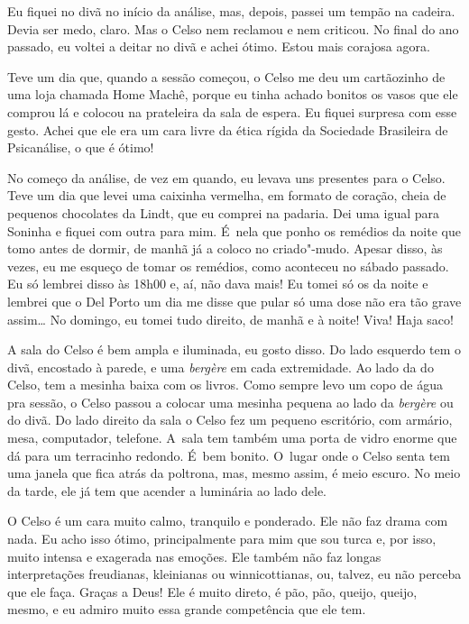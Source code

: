 Eu fiquei no divã no início da análise, mas, depois, passei um
tempão na cadeira. Devia ser medo, claro. Mas o Celso nem reclamou e nem
criticou. No final do ano passado, eu voltei a deitar no divã e achei
ótimo. Estou mais corajosa agora.

Teve um dia que, quando a sessão começou, o Celso me deu um cartãozinho
de uma loja chamada Home Machê, porque eu tinha achado bonitos os vasos
que ele comprou lá e colocou na prateleira da sala de espera. Eu fiquei
surpresa com esse gesto. Achei que ele era um cara livre da ética rígida
da Sociedade Brasileira de Psicanálise, o que é ótimo!

No começo da análise, de vez em quando, eu levava uns presentes para o
Celso. Teve um dia que levei uma caixinha vermelha, em formato de
coração, cheia de pequenos chocolates da Lindt, que eu comprei na
padaria. Dei uma igual para Soninha e fiquei com outra para mim. É~nela
que ponho os remédios da noite que tomo antes de dormir, de manhã já a
coloco no criado"-mudo. Apesar disso, às vezes, eu me esqueço de tomar os
remédios, como aconteceu no sábado passado. Eu só lembrei disso às 18h00
e, aí, não dava mais! Eu tomei só os da noite e lembrei que o Del Porto
um dia me disse que pular só uma dose não era tão grave assim… No
domingo, eu tomei tudo direito, de manhã e à noite! Viva! Haja saco!

A sala do Celso é bem ampla e iluminada, eu gosto disso. Do lado
esquerdo tem o divã, encostado à parede, e uma \emph{bergère} em cada
extremidade. Ao lado da do Celso, tem a mesinha baixa com os livros.
Como sempre levo um copo de água pra sessão, o Celso passou a colocar
uma mesinha pequena ao lado da \emph{bergère} ou do divã. Do lado
direito da sala o Celso fez um pequeno escritório, com armário, mesa,
computador, telefone. A~sala tem também uma porta de vidro enorme que dá
para um terracinho redondo. É~bem bonito. O~lugar onde o Celso senta tem
uma janela que fica atrás da poltrona, mas, mesmo assim, é meio escuro.
No meio da tarde, ele já tem que acender a luminária ao lado dele.

O Celso é um cara muito calmo, tranquilo e ponderado. Ele não faz drama
com nada. Eu acho isso ótimo, principalmente para mim que sou turca e,
por isso, muito intensa e exagerada nas emoções. Ele também não faz
longas interpretações freudianas, kleinianas ou winnicottianas, ou,
talvez, eu não perceba que ele faça. Graças a Deus! Ele é muito direto,
é pão, pão, queijo, queijo, mesmo, e eu admiro muito essa grande
competência que ele tem.

